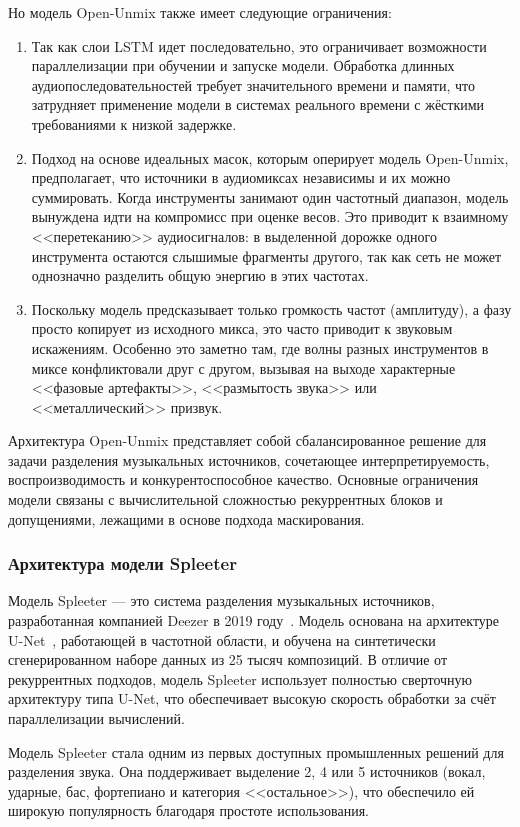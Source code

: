 \documentclass[14pt]{extarticle}
\begin{document}
Но модель Open-Unmix также имеет следующие ограничения:
\begin{enumerate}[label=\arabic*)]
	\item Так как слои LSTM идет последовательно, это ограничивает возможности параллелизации при обучении и запуске модели. 
	Обработка длинных аудиопоследовательностей требует значительного времени и памяти, что затрудняет применение модели в 
	системах реального времени с жёсткими требованиями к низкой задержке.
	\item Подход на основе идеальных масок, которым оперирует модель Open-Unmix, предполагает, что источники в аудиомиксах независимы и их можно суммировать. 
	Когда инструменты занимают один частотный диапазон, модель вынуждена идти на компромисс при оценке весов. 
	Это приводит к взаимному <<перетеканию>> аудиосигналов: в выделенной дорожке одного инструмента остаются слышимые 
	фрагменты другого, так как сеть не может однозначно разделить общую энергию в этих частотах.
	\item Поскольку модель предсказывает только громкость частот (амплитуду), а фазу просто 
	копирует из исходного микса, это часто приводит к звуковым искажениям. Особенно это заметно 
	там, где волны разных инструментов в миксе конфликтовали друг с другом, вызывая на выходе 
	характерные <<фазовые артефакты>>, <<размытость звука>> или <<металлический>> призвук.
\end{enumerate}

Архитектура Open-Unmix представляет собой сбалансированное решение для задачи разделения музыкальных 
источников, сочетающее интерпретируемость, воспроизводимость и конкурентоспособное качество. 
Основные ограничения модели связаны с вычислительной сложностью рекуррентных блоков и допущениями, 
лежащими в основе подхода маскирования.

\subsubsection{Архитектура модели Spleeter}
Модель Spleeter — это система разделения музыкальных источников, разработанная компанией Deezer в 2019 году~\cite{Spleeter}. 
Модель основана на архитектуре U-Net~\cite{unet}, работающей в частотной области, и обучена на синтетически 
сгенерированном наборе данных из 25 тысяч композиций.
В отличие от рекуррентных подходов, модель Spleeter использует полностью сверточную архитектуру типа U-Net,
что обеспечивает высокую скорость обработки за счёт параллелизации вычислений.

Модель Spleeter стала одним из первых доступных промышленных решений для разделения звука. 
Она поддерживает выделение 2, 4 или 5 источников (вокал, ударные, бас, фортепиано и 
категория <<остальное>>), что обеспечило ей широкую популярность благодаря простоте использования.
\end{document}
